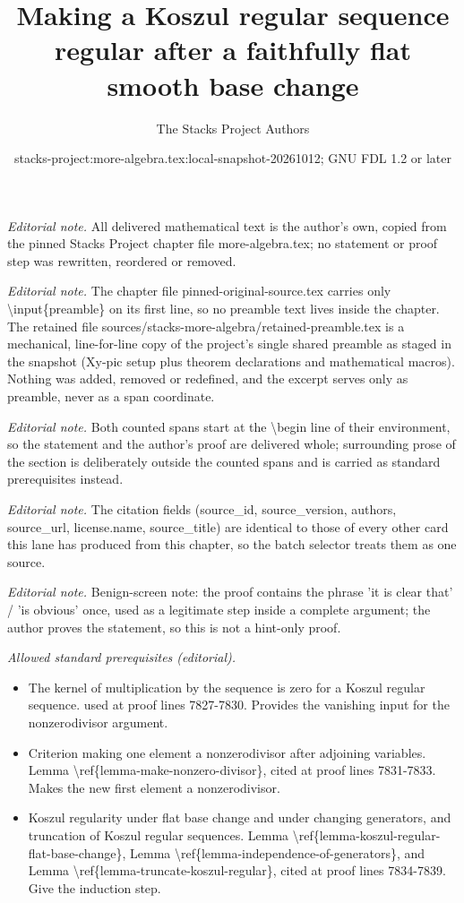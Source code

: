 \documentclass[10pt,a4paper]{amsart}
\title{Making a Koszul regular sequence regular after a faithfully flat smooth base change}
\author{The Stacks Project Authors}
\date{stacks-project:more-algebra.tex:local-snapshot-20261012; GNU FDL 1.2 or later}
\theoremstyle{plain}
\theoremstyle{definition}
\theoremstyle{remark}
\numberwithin{equation}{subsection}
\begin{document}
\maketitle
\setcounter{subsection}{1}
\noindent\textit{Editorial note.} All delivered mathematical text is the author's own, copied from the pinned Stacks Project chapter file more-algebra.tex; no statement or proof step was rewritten, reordered or removed.\par\medskip
\noindent\textit{Editorial note.} The chapter file pinned-original-source.tex carries only \textbackslash{}input\{preamble\} on its first line, so no preamble text lives inside the chapter. The retained file sources/stacks-more-algebra/retained-preamble.tex is a mechanical, line-for-line copy of the project's single shared preamble as staged in the snapshot (Xy-pic setup plus theorem declarations and mathematical macros). Nothing was added, removed or redefined, and the excerpt serves only as preamble, never as a span coordinate.\par\medskip
\noindent\textit{Editorial note.} Both counted spans start at the \textbackslash{}begin line of their environment, so the statement and the author's proof are delivered whole; surrounding prose of the section is deliberately outside the counted spans and is carried as standard prerequisites instead.\par\medskip
\noindent\textit{Editorial note.} The citation fields (source\_id, source\_version, authors, source\_url, license.name, source\_title) are identical to those of every other card this lane has produced from this chapter, so the batch selector treats them as one source.\par\medskip
\noindent\textit{Editorial note.} Benign-screen note: the proof contains the phrase 'it is clear that' / 'is obvious' once, used as a legitimate step inside a complete argument; the author proves the statement, so this is not a hint-only proof.\par\medskip
\noindent\textit{Allowed standard prerequisites (editorial).}\begin{itemize}
\item The kernel of multiplication by the sequence is zero for a Koszul regular sequence. used at proof lines 7827-7830. Provides the vanishing input for the nonzerodivisor argument.
\item Criterion making one element a nonzerodivisor after adjoining variables. Lemma \textbackslash{}ref\{lemma-make-nonzero-divisor\}, cited at proof lines 7831-7833. Makes the new first element a nonzerodivisor.
\item Koszul regularity under flat base change and under changing generators, and truncation of Koszul regular sequences. Lemma \textbackslash{}ref\{lemma-koszul-regular-flat-base-change\}, Lemma \textbackslash{}ref\{lemma-independence-of-generators\}, and Lemma \textbackslash{}ref\{lemma-truncate-koszul-regular\}, cited at proof lines 7834-7839. Give the induction step.
\end{itemize}\medskip
\end{document}
